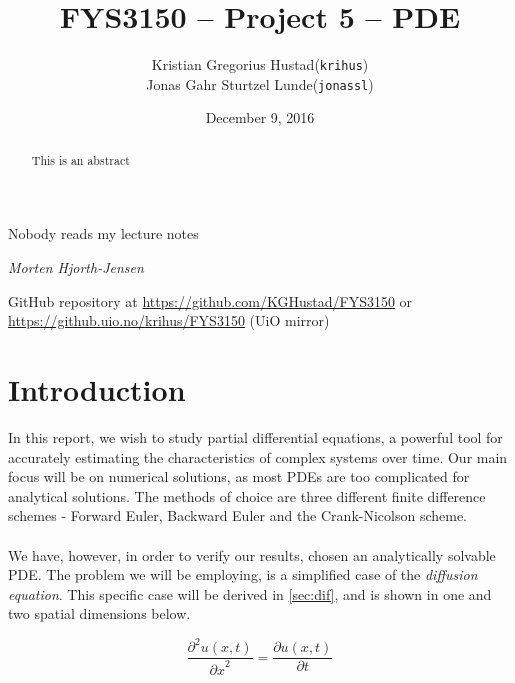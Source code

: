 \documentclass[10pt,a4paper]{article}
\newcommand{\pt}{{\partial t}}
\newcommand{\px}{{\partial x}}
\newcommand{\pu}{{\partial u}}
\newcommand{\ppu}{{\partial^2 u}}
\begin{document}
\title{FYS3150 -- Project 5 -- PDE}
\author{
	\begin{tabular}{rl}
        Kristian Gregorius Hustad & (\texttt{krihus})\\
        Jonas Gahr Sturtzel Lunde & (\texttt{jonassl})
	\end{tabular}}
\date{December 9, 2016}
\maketitle



\setlength{\epigraphwidth}{0.75\textwidth}
\renewcommand{\epigraphflush}{center}
\renewcommand{\beforeepigraphskip}{50pt}
\renewcommand{\afterepigraphskip}{100pt}
\renewcommand{\epigraphsize}{\normalsize}
\epigraph{Nobody reads my lecture notes}
	{\textit{Morten Hjorth-Jensen}}

\begin{abstract}
\noindent
This is an abstract
\end{abstract}

\vfill


\begin{center}
    GitHub repository at \url{https://github.com/KGHustad/FYS3150}
    or \url{https://github.uio.no/krihus/FYS3150} (UiO mirror)
\end{center}


\pagebreak

\tableofcontents



\section{Introduction}
In this report, we wish to study partial differential equations, a powerful tool for accurately estimating the characteristics of complex systems over time. Our main focus will be on numerical solutions, as most PDEs are too complicated for analytical solutions. The methods of choice are three different finite difference schemes - Forward Euler, Backward Euler and the Crank-Nicolson scheme.
\\\\
We have, however, in order to verify our results, chosen an analytically solvable PDE. The problem we will be employing, is a simplified case of the \textit{diffusion equation}. This specific case will be derived in \vref{sec:dif}, and is shown in one and two spatial dimensions below.

\begin{equation}\label{eqn:PDE}
\frac{\ppu(x,t)}{\px^2} = \frac{\pu(x,t)}{\pt}
\end{equation}
\end{document}
